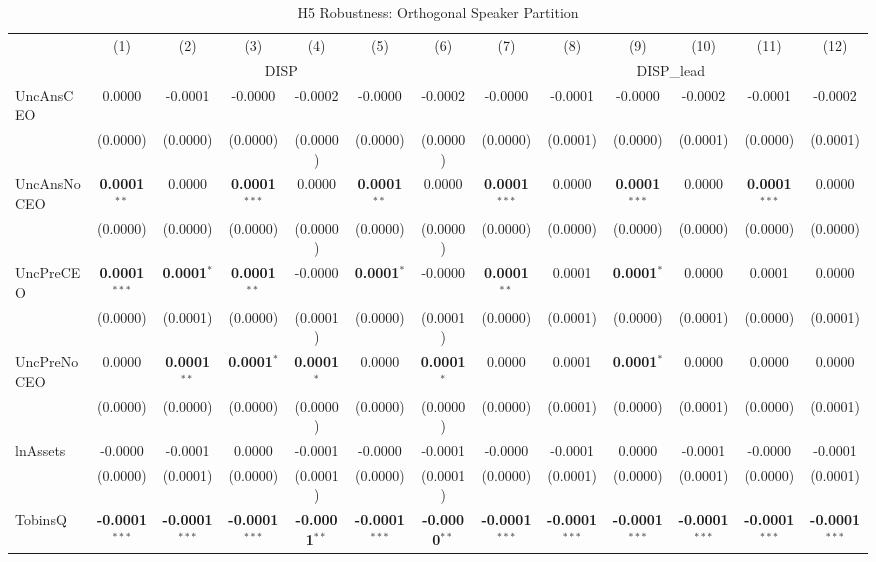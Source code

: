 \documentclass[11pt,a4paper]{article}
\begin{document}
\begin{table}[htbp]
\centering
\caption{H5 Robustness: Orthogonal Speaker Partition}
\label{tab:h5_robust}
\scriptsize
\begin{tabular}{lcccccccccccc}
\toprule
 & (1) & (2) & (3) & (4) & (5) & (6) & (7) & (8) & (9) & (10) & (11) & (12) \\
 & \multicolumn{6}{c}{DISP} & \multicolumn{6}{c}{DISP\_lead} \\
\cmidrule(lr){2-7} \cmidrule(lr){8-13}
\midrule
UncAnsCEO & 0.0000 & -0.0001 & -0.0000 & -0.0002 & -0.0000 & -0.0002 & -0.0000 & -0.0001 & -0.0000 & -0.0002 & -0.0001 & -0.0002 \\
 & (0.0000) & (0.0000) & (0.0000) & (0.0000) & (0.0000) & (0.0000) & (0.0000) & (0.0001) & (0.0000) & (0.0001) & (0.0000) & (0.0001) \\
UncAnsNoCEO & \textbf{0.0001}$^{**}$ & 0.0000 & \textbf{0.0001}$^{***}$ & 0.0000 & \textbf{0.0001}$^{**}$ & 0.0000 & \textbf{0.0001}$^{***}$ & 0.0000 & \textbf{0.0001}$^{***}$ & 0.0000 & \textbf{0.0001}$^{***}$ & 0.0000 \\
 & (0.0000) & (0.0000) & (0.0000) & (0.0000) & (0.0000) & (0.0000) & (0.0000) & (0.0000) & (0.0000) & (0.0000) & (0.0000) & (0.0000) \\
UncPreCEO & \textbf{0.0001}$^{***}$ & \textbf{0.0001}$^{*}$ & \textbf{0.0001}$^{**}$ & -0.0000 & \textbf{0.0001}$^{*}$ & -0.0000 & \textbf{0.0001}$^{**}$ & 0.0001 & \textbf{0.0001}$^{*}$ & 0.0000 & 0.0001 & 0.0000 \\
 & (0.0000) & (0.0001) & (0.0000) & (0.0001) & (0.0000) & (0.0001) & (0.0000) & (0.0001) & (0.0000) & (0.0001) & (0.0000) & (0.0001) \\
UncPreNoCEO & 0.0000 & \textbf{0.0001}$^{**}$ & \textbf{0.0001}$^{*}$ & \textbf{0.0001}$^{*}$ & 0.0000 & \textbf{0.0001}$^{*}$ & 0.0000 & 0.0001 & \textbf{0.0001}$^{*}$ & 0.0000 & 0.0000 & 0.0000 \\
 & (0.0000) & (0.0000) & (0.0000) & (0.0000) & (0.0000) & (0.0000) & (0.0000) & (0.0001) & (0.0000) & (0.0001) & (0.0000) & (0.0001) \\
\midrule
lnAssets & -0.0000 & -0.0001 & 0.0000 & -0.0001 & -0.0000 & -0.0001 & -0.0000 & -0.0001 & 0.0000 & -0.0001 & -0.0000 & -0.0001 \\
 & (0.0000) & (0.0001) & (0.0000) & (0.0001) & (0.0000) & (0.0001) & (0.0000) & (0.0001) & (0.0000) & (0.0001) & (0.0000) & (0.0001) \\
TobinsQ & \textbf{-0.0001}$^{***}$ & \textbf{-0.0001}$^{***}$ & \textbf{-0.0001}$^{***}$ & \textbf{-0.0001}$^{**}$ & \textbf{-0.0001}$^{***}$ & \textbf{-0.0000}$^{**}$ & \textbf{-0.0001}$^{***}$ & \textbf{-0.0001}$^{***}$ & \textbf{-0.0001}$^{***}$ & \textbf{-0.0001}$^{***}$ & \textbf{-0.0001}$^{***}$ & \textbf{-0.0001}$^{***}$ \\

\end{tabular}
\end{table}
\end{document}
